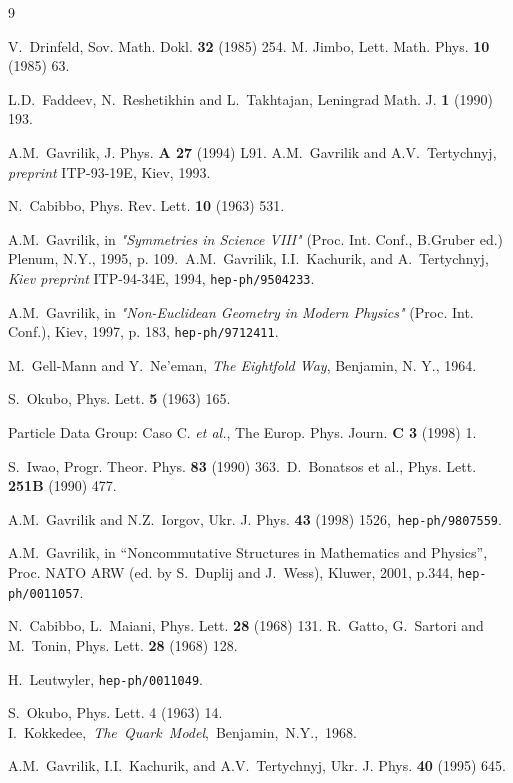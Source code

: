 \documentclass[twoside]{article}
\begin{document}
\begin{thebibliography}{9}

 V.~Drinfeld, Sov. Math. Dokl. {\bf 32} (1985) 254.
         M. Jimbo, Lett. Math. Phys. {\bf 10} (1985) 63.

L.D.~Faddeev, N.~Reshetikhin and L.~Takhtajan, Leningrad Math. J.
{\bf 1} (1990) 193.

 A.M.~Gavrilik, J. Phys. {\bf A 27} (1994) L91.
A.M.~Gavrilik and A.V.~Tertychnyj, {\sl preprint} ITP-93-19E, Kiev, 1993.

N.~Cabibbo, Phys. Rev. Lett.  {\bf 10} (1963) 531.

 A.M.~Gavrilik,
in {\sl "Symmetries in Science VIII"} (Proc. Int. Conf., B.Gruber ed.)
 Plenum, N.Y., 1995, p. 109.\
A.M.~Gavrilik, I.I.~Kachurik, and A.~Tertychnyj,
  {\sl Kiev preprint} ITP-94-34E, 1994, {\tt hep-ph/9504233}.

 A.M.~Gavrilik,
in {\sl "Non-Euclidean Geometry in Modern Physics"}
(Proc. Int. Conf.), Kiev, 1997, p. 183, {\tt hep-ph/9712411}.

 M.~Gell-Mann and Y.~Ne'eman,
  {\sl The Eightfold Way}, Benjamin, N. Y., 1964.

 S.~Okubo, Phys. Lett. {\bf 5} (1963) 165.

 Particle Data Group: Caso C. {\em et al.},
The Europ. Phys. Journ. {\bf C 3} (1998) 1.

 S.~Iwao, Progr. Theor. Phys. {\bf 83} (1990) 363.\
    D.~Bonatsos et al., Phys. Lett. {\bf 251B} (1990) 477.

 A.M.~Gavrilik and N.Z.~Iorgov, Ukr. J. Phys.
      {\bf 43} (1998) 1526,\ {\tt hep-ph/9807559}.

 A.M.~Gavrilik, in ``Noncommutative Structures in
Mathematics and Physics'', Proc. NATO ARW (ed. by S.~Duplij and J.~Wess),
Kluwer, 2001, p.344,   {\tt hep-ph/0011057}.

N.~Cabibbo, L.~Maiani, Phys. Lett. {\bf 28} (1968) 131.
R.~Gatto, G.~Sartori and M.~Tonin, Phys. Lett. {\bf 28} (1968) 128.

\bibitem{leu00}
 H.~Leutwyler, {\tt hep-ph/0011049}.

 S.~Okubo, Phys. Lett. 4 (1963) 14.
 I.~Kokke\-dee,~{\sl The~Quark~Model},~Benjamin,~N.Y.,~1968.

 A.M.~Gavrilik, I.I.~Kachurik, and A.V.~Tertychnyj,
       Ukr. J. Phys.  {\bf 40} (1995) 645.


\end{thebibliography}
\end{document}
